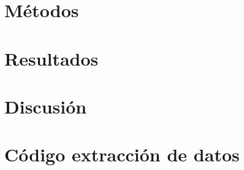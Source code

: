 \section{Métodos}%
\label{sec:metodos}

\section{Resultados}%
\label{sec:resultados}

\section{Discusión}%
\label{sec:discusión}

\pagebreak
\appendix

\section{Código extracción de datos}%
\label{sec:codigo_extraccion_de_datos}







